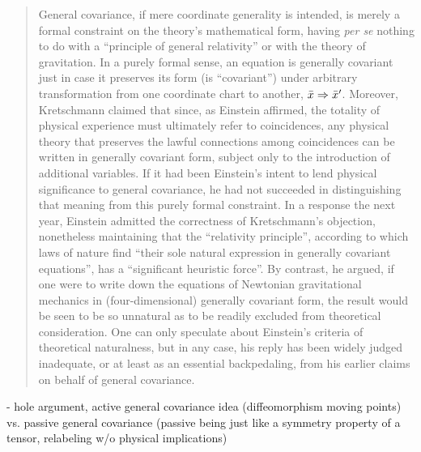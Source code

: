 \begin{quote}
    General covariance, if mere coordinate generality is intended, is merely a formal constraint on the theory's mathematical form, having \emph{per se} nothing to do with a ``principle of general relativity'' or with the theory of gravitation.  In a purely formal sense, an equation is generally covariant just in case it preserves its form (is ``covariant'') under arbitrary transformation from one coordinate chart to another, $\Bar{x} \Rightarrow \Bar{x}'$.  Moreover, Kretschmann claimed that since, as Einstein affirmed, the totality of physical experience must ultimately refer to coincidences, any physical theory that preserves the lawful connections among coincidences can be written in generally covariant form, subject only to the introduction of additional variables.  If it had been Einstein's intent to lend physical significance to general covariance, he had not succeeded in distinguishing that meaning from this purely formal constraint.  In a response the next year, Einstein admitted the correctness of Kretschmann's objection, nonetheless maintaining that the ``relativity principle'', according to which laws of nature find ``their sole natural expression in generally covariant equations'', has a ``significant heuristic force''.  By contrast, he argued, if one were to write down the equations of Newtonian gravitational mechanics in (four-dimensional) generally covariant form, the result would be seen to be so unnatural as to be readily excluded from theoretical consideration.  One can only speculate about Einstein's criteria of theoretical naturalness, but in any case, his reply has been widely judged inadequate, or at least as an essential backpedaling, from his earlier claims on behalf of general covariance.
    
    \citep[p. 17]{Ryckman2005}
\end{quote}

- hole argument, active general covariance idea (diffeomorphism moving points) vs. passive general covariance (passive being just like a symmetry property of a tensor, relabeling w/o physical implications)

